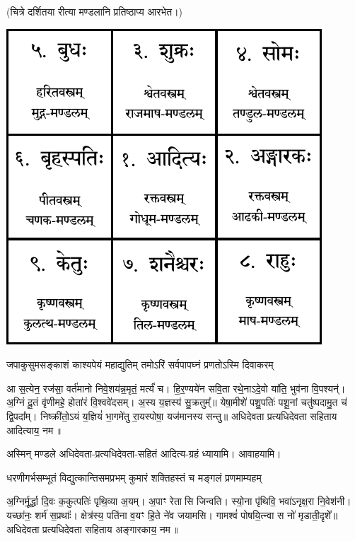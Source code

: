 
\centerline{(चित्रे दर्शितया रीत्या मण्डलानि प्रतिष्ठाप्य आरभेत।)}

\graphicspath{{purvanga/}{../purvanga/}}

\centerline{\includegraphics{navagraha-diagram.pdf}}

\twolineshloka
{जपाकुसुमसङ्काशं काश्यपेयं महाद्युतिम्}
{तमोऽरिं सर्वपापघ्नं प्रणतोऽस्मि दिवाकरम्}

आ स॒त्येन॒ रज॑सा॒ वर्त॑मानो निवे॒शय॑न्न॒मृतं॒ मर्त्यं॑ च। हि॒र॒ण्यये॑न सवि॒ता रथे॒नाऽदे॒वो या॑ति॒
भुव॑ना वि॒पश्यन्॑। अ॒ग्निं दू॒तं वृ॑णीमहे॒ होता॑रं वि॒श्ववे॑दसम्। अ॒स्य य॒ज्ञस्य॑ सु॒क्रतुम्᳚॥
येषा॒मीशे॑ पशु॒पतिः॑ पशू॒नां चतु॑ष्पदामु॒त च॑ द्वि॒पदा᳚म्। निष्क्री॑तो॒ऽयं य॒ज्ञियं॑ भा॒गमे॑तु
रा॒यस्पोषा॒ यज॑मानस्य सन्तु॥  अधिदेवता प्रत्यधिदेवता सहिताय आदित्याय॒ नम॥ 

अस्मिन् मण्डले अधिदेवता-प्रत्यधिदेवता-सहितं आदित्य-ग्रहं ध्यायामि। आवाहयामि।

\twolineshloka
{धरणीगर्भसम्भूतं विद्युत्कान्तिसमप्रभम्}
{कुमारं शक्तिहस्तं च मङ्गलं प्रणमाम्यहम्}

अ॒ग्निर्मू॒र्द्धा दि॒वः क॒कुत्पतिः॑ पृथि॒व्या अ॒यम्। अ॒पाꣳ रेतासि जिन्वति। स्यो॒ना पृ॑थिवि॒
भवा॑ऽनृक्ष॒रा नि॒वेश॑नी। यच्छा॑नः॒ शर्म॑ स॒प्रथाः᳚। क्षेत्र॑स्य॒ पति॑ना व॒यꣳ हि॒ते ने॑व जयामसि।
गामश्वं॑ पोषयि॒त्न्वा स नो॑ मृडाती॒दृशे᳚॥  अधिदेवता प्रत्यधिदेवता सहिताय अङ्गारकाय॒ नम॥ 

